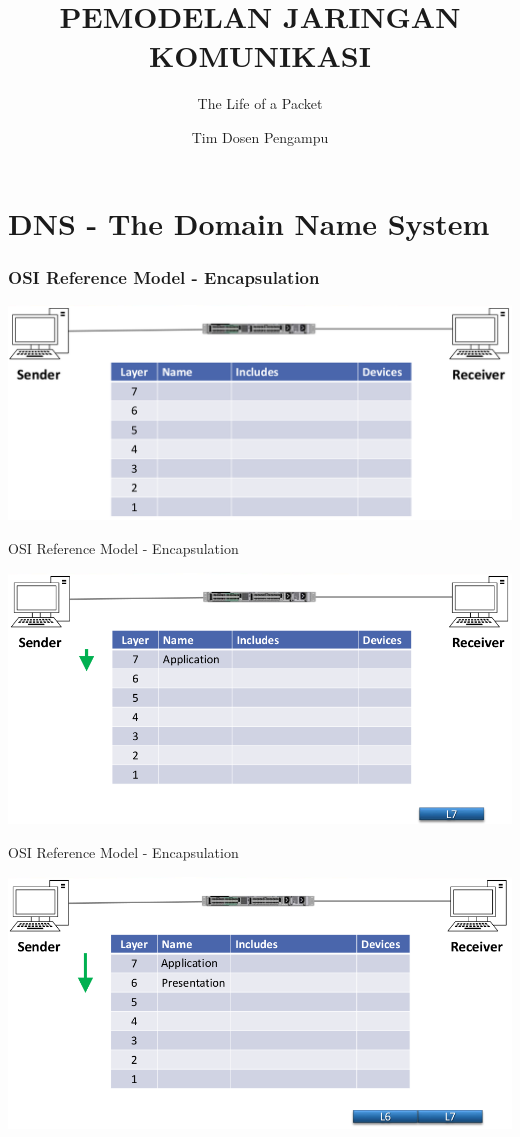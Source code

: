 \documentclass[pdflatex,compress,mathserif]{beamer}
\title{PEMODELAN JARINGAN KOMUNIKASI}
\subtitle{The Life of a Packet}
\author{Tim Dosen Pengampu}
\begin{document}
\maketitle

\section{DNS - The Domain Name System}

\begin{frame}
	\frametitle{OSI Reference Model - Encapsulation}
	\begin{center}
		\includegraphics[width=\linewidth]{img/img01}
	\end{center}
\end{frame}

\begin{frame}{OSI Reference Model - Encapsulation}
	\begin{center}
		\includegraphics[width=\linewidth]{img/img02}
	\end{center}
\end{frame}

\begin{frame}{OSI Reference Model - Encapsulation}
	\begin{center}
		\includegraphics[width=\linewidth]{img/img03}
	\end{center}
\end{frame}
\end{document}
